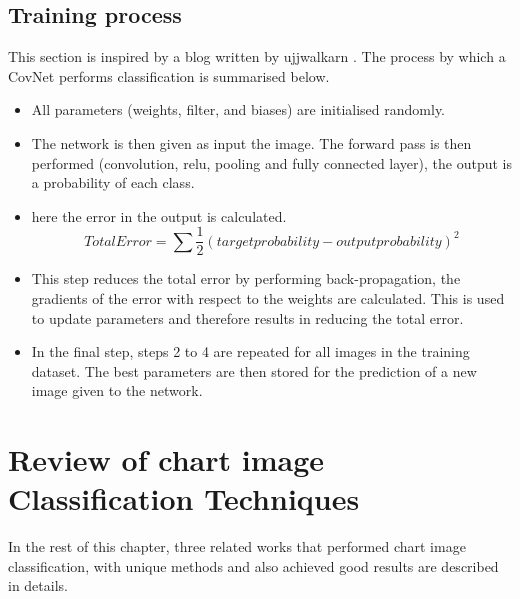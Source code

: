 \documentclass[12pt, a4paper,oneside]{report}
\begin{document}
\subsection{Training process}
This section is inspired by a blog written by ujjwalkarn \cite{cnnonline}. The process by which a CovNet performs classification is summarised below.

\begin{itemize}
	\item All parameters (weights, filter, and biases) are initialised randomly.
	\item The network is then given as input the image. The forward pass is then performed (convolution, relu, pooling and fully connected layer),  the output is a probability of each class.
	\item here the error in the output is calculated.
	\[Total Error = \sum  \frac{1}{2} (target probability - output probability) ^2 \]
	\item This step reduces the total error by performing back-propagation, the gradients of the error with respect to the weights are calculated. This is used to update parameters and therefore results in reducing the total error.
	\item In the final step, steps 2 to 4 are repeated for all images in the training dataset. The best parameters are then stored for the prediction of a new image given to the network.\newline 
	
\end{itemize} 

\section{Review of chart image Classification Techniques}
In the rest of this chapter, three related works that performed chart image classification, with unique methods and also achieved good results are described in details.  
\end{document}
